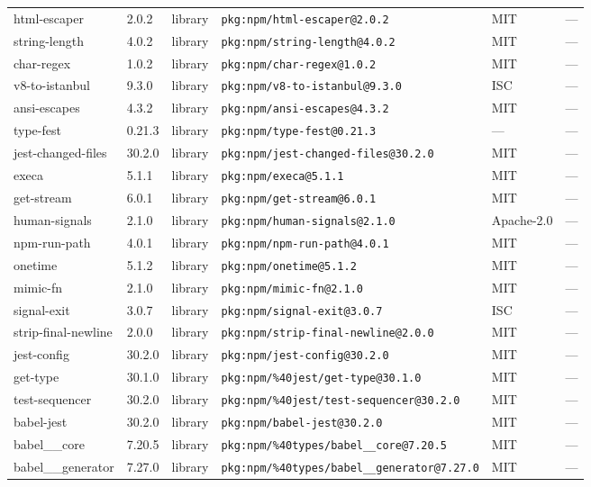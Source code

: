 \documentclass[11pt]{article}
\begin{document}
\begin{longtable}{|l|l|l|p{2.2cm}|l|p{4cm}|}
html-escaper & 2.0.2 & library & \texttt{pkg:npm/html-escaper@2.0.2} & MIT & — \\
string-length & 4.0.2 & library & \texttt{pkg:npm/string-length@4.0.2} & MIT & — \\
char-regex & 1.0.2 & library & \texttt{pkg:npm/char-regex@1.0.2} & MIT & — \\
v8-to-istanbul & 9.3.0 & library & \texttt{pkg:npm/v8-to-istanbul@9.3.0} & ISC & — \\
ansi-escapes & 4.3.2 & library & \texttt{pkg:npm/ansi-escapes@4.3.2} & MIT & — \\
type-fest & 0.21.3 & library & \texttt{pkg:npm/type-fest@0.21.3} & — & — \\
jest-changed-files & 30.2.0 & library & \texttt{pkg:npm/jest-changed-files@30.2.0} & MIT & — \\
execa & 5.1.1 & library & \texttt{pkg:npm/execa@5.1.1} & MIT & — \\
get-stream & 6.0.1 & library & \texttt{pkg:npm/get-stream@6.0.1} & MIT & — \\
human-signals & 2.1.0 & library & \texttt{pkg:npm/human-signals@2.1.0} & Apache-2.0 & — \\
npm-run-path & 4.0.1 & library & \texttt{pkg:npm/npm-run-path@4.0.1} & MIT & — \\
onetime & 5.1.2 & library & \texttt{pkg:npm/onetime@5.1.2} & MIT & — \\
mimic-fn & 2.1.0 & library & \texttt{pkg:npm/mimic-fn@2.1.0} & MIT & — \\
signal-exit & 3.0.7 & library & \texttt{pkg:npm/signal-exit@3.0.7} & ISC & — \\
strip-final-newline & 2.0.0 & library & \texttt{pkg:npm/strip-final-newline@2.0.0} & MIT & — \\
jest-config & 30.2.0 & library & \texttt{pkg:npm/jest-config@30.2.0} & MIT & — \\
get-type & 30.1.0 & library & \texttt{pkg:npm/\%40jest/get-type@30.1.0} & MIT & — \\
test-sequencer & 30.2.0 & library & \texttt{pkg:npm/\%40jest/test-sequencer@30.2.0} & MIT & — \\
babel-jest & 30.2.0 & library & \texttt{pkg:npm/babel-jest@30.2.0} & MIT & — \\
babel\_\_core & 7.20.5 & library & \texttt{pkg:npm/\%40types/babel\_\_core@7.20.5} & MIT & — \\
babel\_\_generator & 7.27.0 & library & \texttt{pkg:npm/\%40types/babel\_\_generator@7.27.0} & MIT & — \\

\end{longtable}
\end{document}

